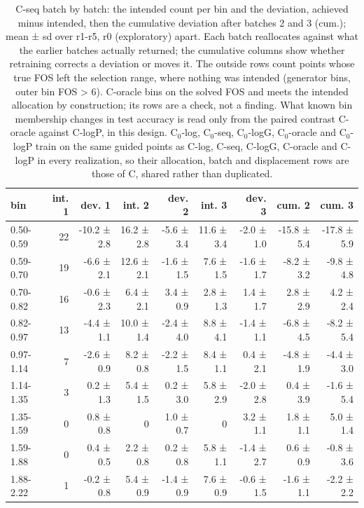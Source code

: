 \begin{table}[htbp]
\centering
\small
\setlength{\tabcolsep}{4pt}
\caption{C-seq batch by batch: the intended count per bin and the deviation, achieved minus intended, then the cumulative deviation after batches 2 and 3 (cum.); mean ± sd over r1-r5, r0 (exploratory) apart. Each batch reallocates against what the earlier batches actually returned; the cumulative columns show whether retraining corrects a deviation or moves it. The outside rows count points whose true FOS left the selection range, where nothing was intended (generator bins, outer bin FOS > 6). C-oracle bins on the solved FOS and meets the intended allocation by construction; its rows are a check, not a finding. What known bin membership changes in test accuracy is read only from the paired contrast C-oracle against C-logP, in this design. C$_0$-log, C$_0$-seq, C$_0$-logG, C$_0$-oracle and C$_0$-logP train on the same guided points as C-log, C-seq, C-logG, C-oracle and C-logP in every realization, so their allocation, batch and displacement rows are those of C, shared rather than duplicated.}
\label{tab:structural:batches}
\begin{tabular}{lrrrrrrrr}
\toprule
bin & int. 1 & dev. 1 & int. 2 & dev. 2 & int. 3 & dev. 3 & cum. 2 & cum. 3 \\
\midrule
0.50-0.59 & 22 & -10.2 ± 2.8 & 16.2 ± 2.8 & -5.6 ± 3.4 & 11.6 ± 3.4 & -2.0 ± 1.0 & -15.8 ± 5.4 & -17.8 ± 5.9 \\
0.59-0.70 & 19 & -6.6 ± 2.1 & 12.6 ± 2.1 & -1.6 ± 1.5 & 7.6 ± 1.5 & -1.6 ± 1.7 & -8.2 ± 3.2 & -9.8 ± 4.8 \\
0.70-0.82 & 16 & -0.6 ± 2.3 & 6.4 ± 2.1 & 3.4 ± 0.9 & 2.8 ± 1.3 & 1.4 ± 1.7 & 2.8 ± 2.9 & 4.2 ± 2.4 \\
0.82-0.97 & 13 & -4.4 ± 1.1 & 10.0 ± 1.4 & -2.4 ± 4.0 & 8.8 ± 4.1 & -1.4 ± 1.1 & -6.8 ± 4.5 & -8.2 ± 5.4 \\
0.97-1.14 & 7 & -2.6 ± 0.9 & 8.2 ± 0.8 & -2.2 ± 1.5 & 8.4 ± 1.1 & 0.4 ± 2.1 & -4.8 ± 1.9 & -4.4 ± 3.0 \\
1.14-1.35 & 3 & 0.2 ± 1.3 & 5.4 ± 1.5 & 0.2 ± 3.0 & 5.8 ± 2.9 & -2.0 ± 2.8 & 0.4 ± 3.9 & -1.6 ± 5.4 \\
1.35-1.59 & 0 & 0.8 ± 0.8 & 0 & 1.0 ± 0.7 & 0 & 3.2 ± 1.1 & 1.8 ± 1.1 & 5.0 ± 1.4 \\
1.59-1.88 & 0 & 0.4 ± 0.5 & 2.2 ± 0.8 & 0.2 ± 0.8 & 5.8 ± 1.1 & -1.4 ± 2.7 & 0.6 ± 0.9 & -0.8 ± 3.6 \\
1.88-2.22 & 1 & -0.2 ± 0.8 & 5.4 ± 0.9 & -1.4 ± 0.9 & 7.6 ± 0.9 & -0.6 ± 1.5 & -1.6 ± 1.1 & -2.2 ± 2.2 \\

\end{tabular}
\end{table}
